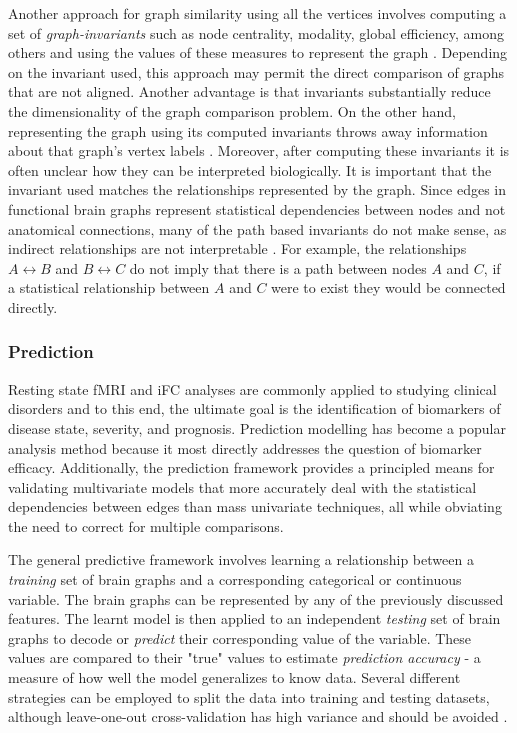 Another approach for graph similarity using all the vertices involves computing a set of \emph{graph-invariants} such as node centrality, modality, global efficiency, among others and using the values of these measures to represent the graph \cite{rubinov}\cite{bullmoreReview}. Depending on the invariant used, this approach may permit the direct comparison of graphs that are not aligned. Another advantage is that invariants substantially reduce the dimensionality of the graph comparison problem. On the other hand, representing the graph using its computed invariants throws away information about that graph's vertex labels \cite{Vogelstein2012}. Moreover, after computing these invariants it is often unclear how they can be interpreted biologically. It is important that the invariant used matches the relationships represented by the graph. Since edges in functional brain graphs represent statistical dependencies between nodes and not anatomical connections, many of the path based invariants do not make sense, as indirect relationships are not interpretable \cite{}. For example, the relationships $A \leftrightarrow B$ and $B \leftrightarrow C$ do not imply that there is a path between nodes $A$ and $C$, if a statistical relationship between $A$ and $C$ were to exist they would be connected directly.   

\subsubsection{Prediction}

Resting state fMRI and iFC analyses are commonly applied to studying clinical disorders and to this end, the ultimate goal is the identification of biomarkers of disease state, severity, and prognosis\cite{DiMartino}. Prediction modelling has become a popular analysis method because it most directly addresses the question of biomarker efficacy\cite{craddock,Dosenbach,review}. Additionally, the prediction framework provides a principled means for validating multivariate models that more accurately deal with the statistical dependencies between edges than mass univariate techniques, all while obviating the need to correct for multiple comparisons. 

The general predictive framework involves learning a relationship between a \emph{training} set of brain graphs and a corresponding categorical or continuous variable. The brain graphs can be represented by any of the previously discussed features. The learnt model is then applied to an independent \emph{testing} set of brain graphs to decode or \emph{predict} their corresponding value of the variable. These values are compared to their "true" values to estimate \emph{prediction accuracy} - a measure of how well the model generalizes to know data. Several different strategies can be employed to split the data into training and testing datasets, although leave-one-out cross-validation has high variance and should be avoided \cite{}. 


